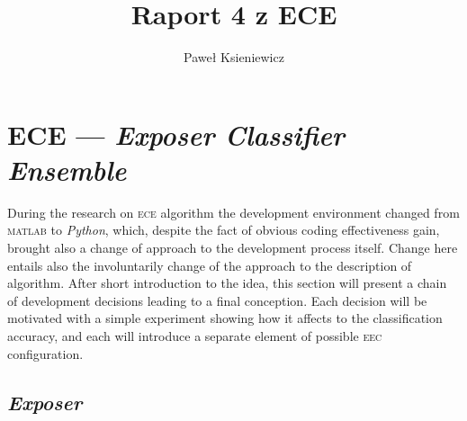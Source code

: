 \documentclass[]{article}
\title{Raport 4 z ECE}
\author{Paweł Ksieniewicz}
\begin{document}
\newenvironment{ride}[2]
{
	\caption{#2}
    \label{tab:results}
	\centering
	\begin{tabular}{lS>{\color{red}}S}
		\\\toprule{promień} & {accuracy} & {\textsc{bac}} \\\midrule
	    \csvreader[head to column names]{#1}{}%
	    {\radius & \accuracy & \bac\\}%
	\end{tabular}
	
	\begin{tikzpicture}
	\begin{axis}[
	    grid=both,
	    grid style={line width=.1pt, draw=gray!10},
	    major grid style={line width=.2pt,draw=gray!50},
	    width=6cm,
	    height=3cm,
	    xmin=0.01, xmax=0.29,
	    ymin=.55, ymax=1,
	    ytick = {.5, .6, .7, .8, .9, 1},
	    yticklabels = { ~, 60\%, ~, 80\%, ~, 100\%},
	    xtick = {0, .05, .1, 0.15, 0.2, 0.25},
		xticklabels = {~, 5,10,15,20,25},
		minor tick num=2,
		ticklabel style={font=\tiny,fill=white}		]
		\addplot[color=black] table [x=radius, y=accuracy, col sep=comma] {#1};
		\addplot[color=red] table [x=radius, y=bac, col sep=comma] {#1};
	\end{axis}
	\end{tikzpicture}
}{}

\maketitle
\newpage

\section{ECE --- \emph{Exposer Classifier Ensemble}}

During the research on \textsc{ece} algorithm the development environment changed from \textsc{matlab} to \emph{Python}, which, despite the fact of obvious coding effectiveness gain, brought also a change of approach to the development process itself. Change here entails also the involuntarily change of the approach to the description of algorithm. After short introduction to the idea, this section will present a chain of development decisions leading to a final conception. Each decision will be motivated with a simple experiment showing how it affects to the classification accuracy, and each will introduce a separate element of possible \textsc{eec} configuration.

\subsection{\emph{Exposer}}
\label{exposer}
\end{document}

